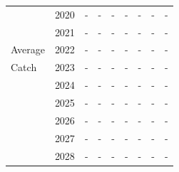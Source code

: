 \documentclass[12pt,]{article}
\begin{document}
\begin{table}[ht]
{\begin{tabular}{l|cc|>{\centering}p{.7in}c|>{\centering}p{.7in}c|>{\centering}p{.7in}c}
   & 2020 & - & - & - & - & - & - & - \\ 
   & 2021 & - & - & - & - & - & - & - \\ 
  Average & 2022 & - & - & - & - & - & - & - \\ 
  Catch & 2023 & - & - & - & - & - & - & - \\ 
   & 2024 & - & - & - & - & - & - & - \\ 
   & 2025 & - & - & - & - & - & - & - \\ 
   & 2026 & - & - & - & - & - & - & - \\ 
   & 2027 & - & - & - & - & - & - & - \\ 
   & 2028 & - & - & - & - & - & - & - \\ 
   \hline
\end{tabular}
}
\end{table}
\end{document}
